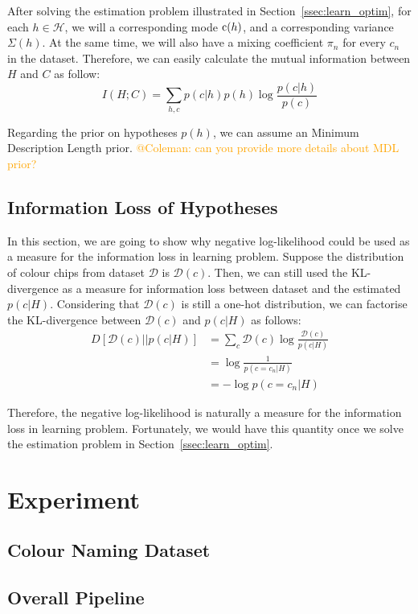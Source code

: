 \documentclass[11pt]{article}
\begin{document}
After solving the estimation problem illustrated in Section~\ref{ssec:learn_optim}, for each $h\in\mathcal{H}$, we will a corresponding mode ${\textnormal{c}}(h)$, and a corresponding variance $\Sigma(h)$. 
At the same time, we will also have a mixing coefficient $\pi_n$ for every $c_n$ in the dataset.
Therefore, we can easily calculate the mutual information between $H$ and $C$ as follow:
\begin{equation}
    I(H;C) = \sum_{h,c} p(c|h)p(h)\log\frac{p(c|h)}{p(c)}
\end{equation}

Regarding the prior on hypotheses $p(h)$, we can assume an Minimum Description Length prior.
\textcolor{orange}{@Coleman: can you provide more details about MDL prior?}

\subsection{Information Loss of Hypotheses}
\label{ssec:learn_info_loss}

In this section, we are going to show why negative log-likelihood could be used as a measure for the information loss in learning problem.
Suppose the distribution of colour chips from dataset $\mathcal{D}$ is $\mathcal{D}(c)$.
Then, we can still used the KL-divergence as a measure for information loss between dataset and the estimated $p(c|H)$.
Considering that $\mathcal{D}(c)$ is still a one-hot distribution, we can factorise the KL-divergence between $\mathcal{D}(c)$ and $p(c|H)$ as follows:
\begin{equation}
    \begin{split}
        D[\mathcal{D}(c)||p(c|H)] & = \sum_{c} \mathcal{D}(c)\log \frac{\mathcal{D}(c)}{p(c|H)} \\
        & = \log \frac{1}{p(c=c_n|H)} \\
        & = -\log p(c=c_n|H)
    \end{split}
    \label{eq:learn_info_loss}
\end{equation}

Therefore, the negative log-likelihood is naturally a measure for the information loss in learning problem.
Fortunately, we would have this quantity once we solve the estimation problem in Section~\ref{ssec:learn_optim}.

\section{Experiment}
\label{sec:experiment}

\subsection{Colour Naming Dataset}
\label{ssec:color_dataset}

\subsection{Overall Pipeline}
\label{ssec:overall_pipeling}







\end{document}
